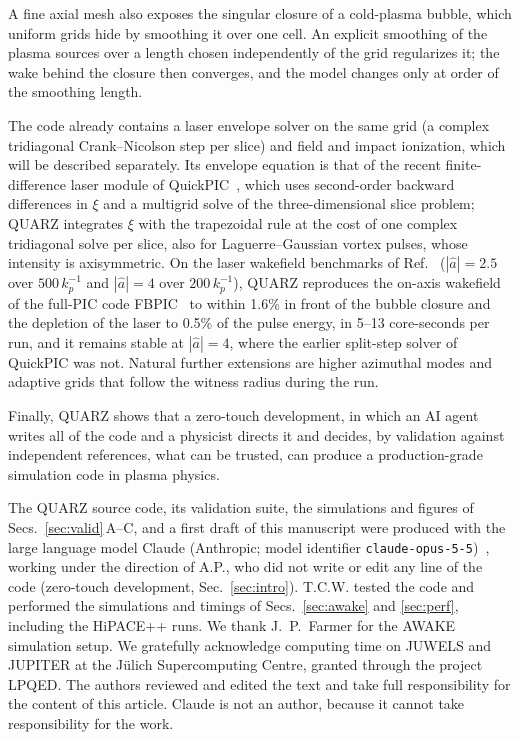 \documentclass[aps,prab,reprint,floatfix,superscriptaddress,amsmath,amssymb]{revtex4-2}
\begin{document}
A fine axial mesh also exposes the singular closure of a cold-plasma bubble, which uniform grids hide by smoothing it over one cell. An explicit smoothing of the plasma sources over a length chosen independently of the grid regularizes it; the wake behind the closure then converges, and the model changes only at order of the smoothing length.

The code already contains a laser envelope solver on the same grid (a complex tridiagonal Crank--Nicolson step per slice) and field and impact ionization, which will be described separately. Its envelope equation is that of the recent finite-difference laser module of QuickPIC~\cite{Meng2026}, which uses second-order backward differences in $\xi$ and a multigrid solve of the three-dimensional slice problem; QUARZ integrates $\xi$ with the trapezoidal rule at the cost of one complex tridiagonal solve per slice, also for Laguerre--Gaussian vortex pulses, whose intensity is axisymmetric. On the laser wakefield benchmarks of Ref.~\cite{Meng2026} ($|\hat a| = 2.5$ over $500\,k_p^{-1}$ and $|\hat a| = 4$ over $200\,k_p^{-1}$), QUARZ reproduces the on-axis wakefield of the full-PIC code FBPIC~\cite{Lehe2016} to within 1.6\% in front of the bubble closure and the depletion of the laser to 0.5\% of the pulse energy, in 5--13 core-seconds per run, and it remains stable at $|\hat a| = 4$, where the earlier split-step solver of QuickPIC was not. Natural further extensions are higher azimuthal modes and adaptive grids that follow the witness radius during the run.

Finally, QUARZ shows that a zero-touch development, in which an AI agent writes all of the code and a physicist directs it and decides, by validation against independent references, what can be trusted, can produce a production-grade simulation code in plasma physics.

\begin{acknowledgments}
The QUARZ source code, its validation suite, the simulations and figures of Secs.~\ref{sec:valid}\,A--C, and a first draft of this manuscript were produced with the large language model Claude (Anthropic; model identifier \texttt{claude-opus-5-5})~\cite{Claude}, working under the direction of A.P., who did not write or edit any line of the code (zero-touch development, Sec.~\ref{sec:intro}). T.C.W. tested the code and performed the simulations and timings of Secs.~\ref{sec:awake} and \ref{sec:perf}, including the HiPACE++ runs. We thank J.~P.~Farmer for the AWAKE simulation setup. We gratefully acknowledge computing time on JUWELS and JUPITER at the J\"ulich Supercomputing Centre, granted through the project LPQED. The authors reviewed and edited the text and take full responsibility for the content of this article. Claude is not an author, because it cannot take responsibility for the work.
\end{acknowledgments}
\end{document}
